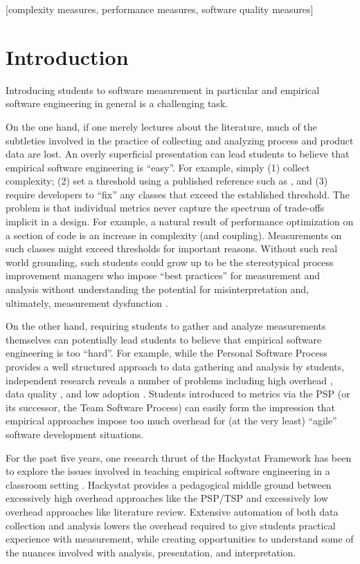 \documentclass{acm_proc_article-sp}
\begin{document}
[complexity measures, performance measures, software quality measures]

\section{Introduction}

Introducing students to software measurement in particular and empirical
software engineering in general is a challenging task.  

On the one hand, if one merely lectures about the literature, much of the
subtleties involved in the practice of collecting and analyzing process and
product data are lost.  An overly superficial presentation can lead
students to believe that empirical software engineering is ``easy''. For example,
simply (1) collect complexity; (2) set a threshold using a published
reference such as \cite{Clark08}, and (3) require developers to ``fix'' any
classes that exceed the established threshold.  The problem is that
individual metrics never capture the spectrum of trade-offs implicit in a
design. For example, a natural result of performance optimization on a
section of code is an increase in complexity (and coupling). Measurements
on such classes might exceed thresholds for important reasons.  Without
such real world grounding, such students could grow up to be the
stereotypical process improvement managers who impose ``best practices''
for measurement and analysis without understanding the potential for
misinterpretation and, ultimately, measurement dysfunction \cite{Austin96}.

On the other hand, requiring students to gather and analyze measurements
themselves can potentially lead students to believe that empirical software
engineering is too ``hard''.  For example, while the Personal Software
Process \cite{Humphrey95} provides a well structured approach to data
gathering and analysis by students, independent research reveals a number
of problems including high overhead \cite{csdl2-01-12}, data quality
\cite{csdl-98-13}, and low adoption \cite{Borstler02}.  Students introduced
to metrics via the PSP (or its successor, the Team Software Process) can
easily form the impression that empirical approaches impose too much
overhead for (at the very least) ``agile'' software development situations.

For the past five years, one research thrust of the Hackystat Framework has
been to explore the issues involved in teaching empirical software
engineering in a classroom setting \cite{csdl2-03-12,csdl2-07-02}.
Hackystat provides a pedagogical middle ground between excessively high
overhead approaches like the PSP/TSP and excessively low overhead
approaches like literature review.  Extensive automation of both data
collection and analysis lowers the overhead required to give students
practical experience with measurement, while creating opportunities to
understand some of the nuances involved with analysis, presentation, and
interpretation.
\end{document}

